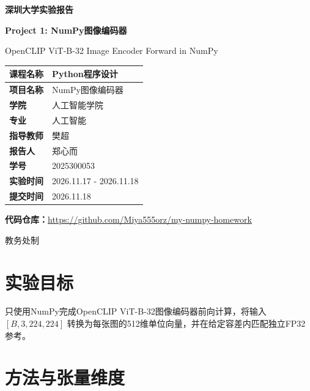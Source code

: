 \documentclass[a4paper,11pt]{ctexart}
\begin{document}
\begin{titlepage}
\centering
\vspace*{1.2cm}
{\Huge\bfseries 深\quad 圳\quad 大\quad 学\quad 实\quad 验\quad 报\quad 告\par}
\vspace{1.2cm}
{\Large\color{SZUBlue}\bfseries Project 1: NumPy图像编码器\par}
\vspace{0.4cm}
{\small OpenCLIP ViT-B-32 Image Encoder Forward in NumPy\par}
\vspace{1.4cm}
\renewcommand{\arraystretch}{1.8}
\begin{tabular}{>{\bfseries}p{3cm}p{9cm}}
课程名称 & Python程序设计\\\hline
项目名称 & NumPy图像编码器\\\hline
学院 & 人工智能学院\\\hline
专业 & 人工智能\\\hline
指导教师 & 樊超\\\hline
报告人 & 郑心而\\\hline
学号 & 2025300053\\\hline
实验时间 & 2026.11.17 - 2026.11.18\\\hline
提交时间 & 2026.11.18\\\hline
\end{tabular}
\vfill
\textbf{代码仓库：}\url{https://github.com/Miya555orz/my-numpy-homework}
\vspace{1cm}
\par 教务处制
\end{titlepage}

\section{实验目标}
只使用NumPy完成OpenCLIP ViT-B-32图像编码器前向计算，将输入
$[B,3,224,224]$ 转换为每张图的512维单位向量，并在给定容差内匹配独立FP32参考。

\section{方法与张量维度}
\begin{center}
\end{center}
\end{document}
